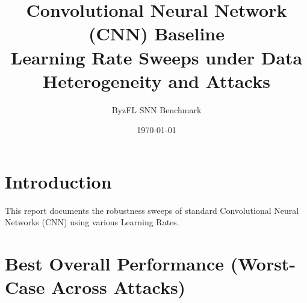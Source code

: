 \documentclass{article}
\title{Convolutional Neural Network (CNN) Baseline\\Learning Rate Sweeps under Data Heterogeneity and Attacks}
\author{ByzFL SNN Benchmark}
\date{\today}
\begin{document}
\maketitle

\clearpage
\tableofcontents
\clearpage

\section{Introduction}
This report documents the robustness sweeps of standard Convolutional Neural Networks (CNN) using various Learning Rates.

\clearpage

\section{Best Overall Performance (Worst-Case Across Attacks)}
\end{document}
